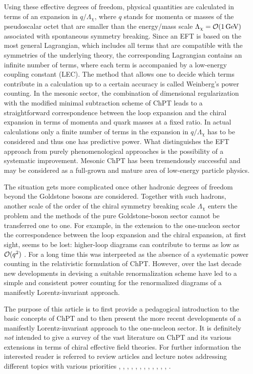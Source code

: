 \documentclass[twoside,12pt]{article}
\begin{document}
   Using these effective degrees of freedom, physical quantities are calculated in
terms of an expansion in $q/\Lambda_\chi$, where $q$ stands for
momenta or masses of the pseudoscalar octet that are smaller than the energy/mass scale
$\Lambda_\chi={\cal O}(1\,\mbox{GeV})$ associated with spontaneous symmetry
breaking.
   Since an EFT is based on the most general Lagrangian, which includes
all terms that are compatible with the symmetries of the underlying
theory, the corresponding Lagrangian contains an infinite number of
terms, where each term is accompanied by a low-energy coupling constant
(LEC).
   The method that allows one to decide which terms
contribute in a calculation up to a certain accuracy is called
Weinberg's power counting.
   In the mesonic sector, the combination of dimensional regularization
with the modified minimal subtraction scheme of ChPT leads to
a straightforward correspondence between the loop expansion and the
chiral expansion in terms of momenta and quark masses at a fixed ratio.
   In actual calculations only a finite number of terms in the expansion in
$q/\Lambda_\chi$ has to be considered and thus one has predictive power.
   What distinguishes the EFT approach from purely phenomenological approaches
is the possibility of a systematic improvement.
   Mesonic ChPT has been tremendously successful and may be considered as
a full-grown and mature area of low-energy particle physics.

   The situation gets more complicated once other hadronic degrees of freedom beyond
the Goldstone bosons are considered.
   Together with such hadrons, another scale of the order of the chiral symmetry
breaking scale $\Lambda_\chi$ enters the problem and the methods of the
pure Goldstone-boson sector cannot be transferred one to one.
   For example, in the extension to the one-nucleon sector %
the correspondence between the loop expansion and the chiral expansion,
at first sight, seems to be lost: higher-loop
diagrams can contribute to terms as low as ${\cal O}(q^2)$ \cite{Gasser:1987rb}.
   For a long time this was interpreted as the absence of a systematic power
counting in the relativistic formulation of ChPT.
   However, over the last decade new developments in devising a suitable renormalization
scheme have led to a simple and consistent power counting for the renormalized
diagrams of a manifestly Lorentz-invariant approach.

   The purpose of this article is to first provide a pedagogical introduction
to the basic concepts of ChPT and to then present the
more recent developments of a manifestly Lorentz-invariant approach to the
one-nucleon sector.
   It is definitely {\em not} intended to give a survey of the vast literature
on ChPT and its various extensions in terms of chiral
effective field theories.
   For further information the interested reader is referred to review articles
and lecture notes addressing different topics with various priorities
\cite{Bijnens:1993xi},
\cite{Georgi:1994qn},
\cite{Ecker:1994gg},
\cite{Pich:1995bw},
\cite{Bernard:1995dp},
\cite{Hemmert:1997ye},
\cite{Burgess:1998ku},
\cite{Scherer:2002tk},
\cite{Scherer:2005ri},
\cite{Epelbaum:2005pn},
\cite{Bijnens:2006zp},
\cite{Bernard:2006gx},
\cite{Bernard:2007zu}.
\end{document}
